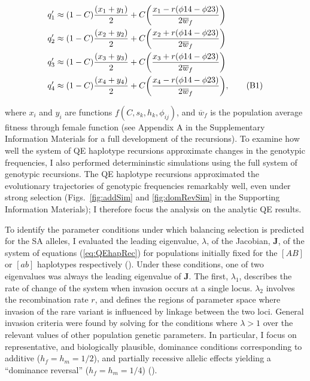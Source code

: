 \documentclass{article}
\newcommand\numberthis{\addtocounter{equation}{1}\tag{\theequation}}
\begin{document}
\begin{align*} \label{eq:QEhapRec}
	q'_1 &\approx (1 - C) \frac{(x_1 + y_1)}{2} + C \bigg( \frac{x_1 - r(\phi{14} - \phi{23})}{2 \overline{w}_f} \bigg) \\
	q'_2 &\approx (1 - C) \frac{(x_2 + y_2)}{2} + C \bigg( \frac{x_2 + r(\phi{14} - \phi{23})}{2 \overline{w}_f} \bigg) \\
	q'_3 &\approx (1 - C) \frac{(x_3 + y_3)}{2} + C \bigg( \frac{x_3 + r(\phi{14} - \phi{23})}{2 \overline{w}_f} \bigg) \\
	q'_4 &\approx (1 - C) \frac{(x_4 + y_4)}{2} + C \bigg( \frac{x_4 - r(\phi{14} - \phi{23})}{2 \overline{w}_f} \bigg), \numberthis
\end{align*}

\noindent{} where $x_i$ and $y_i$ are functions $f(C, s_k, h_k, \phi_{ij})$, and $\overline{w}_f$ is the population average fitness through female function (see Appendix A in the Supplementary Information Materials	 for a full development of the recursions). To examine how well the system of QE haplotype recursions approximate changes in the genotypic frequencies, I also performed determininstic simulations using the full system of genotypic recursions. The QE haplotype recursions approximated the evolutionary trajectories of genotypic frequencies remarkably well, even under strong selection (Figs.~\ref{fig:addSim} and \ref{fig:domRevSim} in the Supporting Information Materials); I therefore focus the analysis on the analytic QE results. 

To identify the parameter conditions under which balancing selection is predicted for the SA alleles, I evaluated the leading eigenvalue, $\lambda$, of the Jacobian, $\mathbf{J}$, of the system of equations (\ref{eq:QEhapRec}) for populations initially fixed for the $[AB]$ or $[ab]$ haplotypes respectively (\citealt{Prout1968, OttoDay2007}). Under these conditions, one of two eigenvalues was always the leading eigenvalue of $\mathbf{J}$. The first, $\lambda_1$, describes the rate of change of the system when invasion occurs at a single locus. $\lambda_2$ involves the recombination rate $r$, and defines the regions of parameter space where invasion of the rare variant is influenced by linkage between the two loci. General invasion criteria were found by solving for the conditions where $\lambda > 1$ over the relevant values of other population genetic parameters. In particular, I focus on representative, and biologically plausible, dominance conditions corresponding to additive ($h_f = h_m = 1/2$), and partially recessive allelic effects yielding a ``dominance reversal'' ($h_f = h_m = 1/4$) (\citealt{Kidwell1977, Prout2000, Fry2010, JordanConn2014}).
\end{document}
